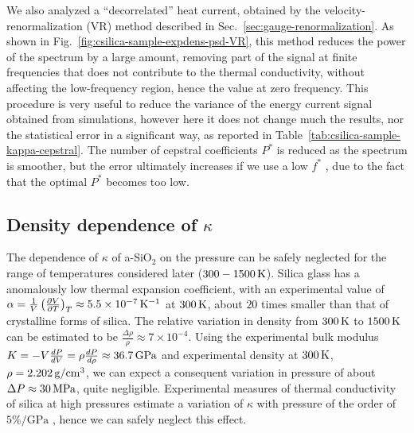 We also analyzed a ``decorrelated'' heat current, obtained by the velocity-renormalization (VR) method described in Sec.~\ref{sec:gauge-renormalization}. As shown in Fig.~\ref{fig:csilica-sample-expdens-psd-VR}, this method reduces the power of the spectrum by a large amount, removing part of the signal at finite frequencies that does not contribute to the thermal conductivity, without affecting the low-frequency region, hence the value at zero frequency. 
This procedure is very useful to reduce the variance of the energy current signal obtained from \abinitio simulations, however here it does not change much the results, nor the statistical error in a significant way, as reported in Table~\ref{tab:csilica-sample-kappa-cepstral}. 
The number of cepstral coefficients $P^*$ is reduced as the spectrum is smoother, but the error ultimately increases if we use a low $f^*$ , due to the fact that the optimal $P^*$ becomes too low. 



\subsection{Density dependence of \texorpdfstring{$\kappa$}{thermal conductivity}}
The dependence of $\kappa$ of a-SiO$_2$ on the pressure can be safely neglected for the range of temperatures considered later ($300-1500\,\mathrm{K}$). 
Silica glass has a anomalously low thermal expansion coefficient, with an experimental value of $\alpha = \frac{1}{V}\left(\frac{\partial V}{\partial T}\right)_T \approx 5.5\times 10^{-7} \,\mathrm{K^{-1}}$ at $300\,\mathrm{K}$, about $20$ times smaller than that of crystalline forms of silica. 
The relative variation in density from $300\,\mathrm{K}$ to $1500\,\mathrm{K}$ can be estimated to be $\frac{\Delta\rho}{\rho} \approx 7\times 10^{-4}$.
Using the experimental bulk modulus $K=-V\frac{dP}{dV}=\rho\frac{dP}{d\rho}\approx 36.7\,\mathrm{GPa}$ and experimental density at $300\,\mathrm{K}$, $\rho=2.202\,\mathrm{g/cm^3}$, we can expect a consequent variation in pressure of about $\Delta P \approx 30\,\mathrm{MPa}$, quite negligible. 
Experimental measures of thermal conductivity of silica at high pressures estimate a variation of $\kappa$ with pressure of the order of $5\%/\mathrm{GPa}$ \cite{Andersson1992}, hence we can safely neglect this effect. 

